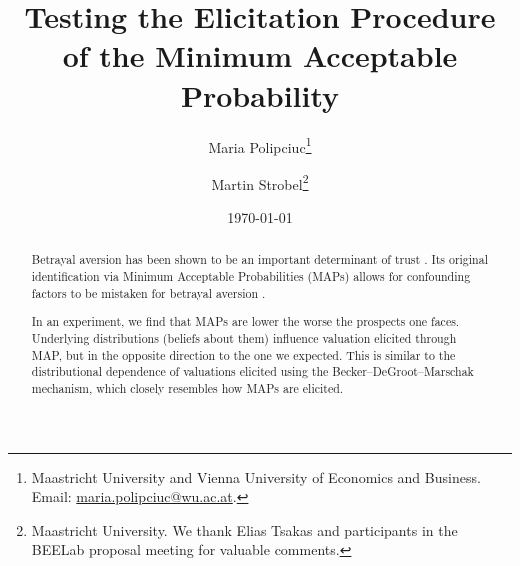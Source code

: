 
\title{Testing the Elicitation Procedure \\ of the Minimum Acceptable Probability}
\author{Maria Polipciuc\thanks{Maastricht University and Vienna University of Economics and Business. Email: \url{maria.polipciuc@wu.ac.at}.} \and Martin Strobel\thanks{Maastricht University. We thank Elias Tsakas and participants in the BEELab proposal meeting for valuable comments.}}
\date{\today	\vspace{1cm}}
\titlepage



\begin{titlepage}
\clearpage
\maketitle
\thispagestyle{empty}


\begin{abstract}
Betrayal aversion has been shown to be an important determinant of trust \citep{Bohnet2004}.
Its original identification via Minimum Acceptable Probabilities (MAPs) allows for confounding factors to be mistaken for betrayal aversion \citep{Li2020a}.


In an experiment, we find that MAPs are lower the worse the prospects one faces.
Underlying distributions (beliefs about them) influence valuation elicited through MAP, but in the opposite direction to the one we expected.
This is similar to the distributional dependence of valuations elicited using the Becker--DeGroot--Marschak mechanism, which closely resembles how MAPs are elicited.

\end{abstract}
\end{titlepage}



